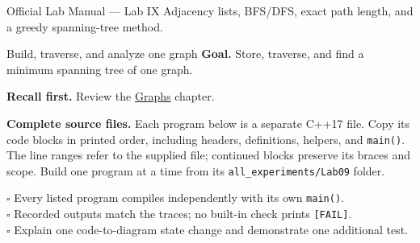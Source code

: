 
\begin{sourcealignment}{Official Lab Manual --- Lab IX}
Adjacency lists, BFS/DFS, exact path length, and a greedy spanning-tree method.
\end{sourcealignment}

\begin{labproject}{Build, traverse, and analyze one graph}
\textbf{Goal.} Store, traverse, and find a minimum spanning tree of one graph.

\textbf{Recall first.} Review the \hyperref[ch:graphs]{Graphs} chapter.

\textbf{Complete source files.} Each program below is a separate C++17 file.
Copy its code blocks in printed order, including headers, definitions, helpers, and \texttt{main()}.
The line ranges refer to the supplied file; continued blocks preserve its braces and scope.
Build one program at a time from its \texttt{all\_experiments/Lab09} folder.



\tcbbreak

\end{labproject}

\begin{verification}
$\square$ Every listed program compiles independently with its own \texttt{main()}.\\
$\square$ Recorded outputs match the traces; no built-in check prints \texttt{[FAIL]}.\\
$\square$ Explain one code-to-diagram state change and demonstrate one additional test.
\end{verification}
